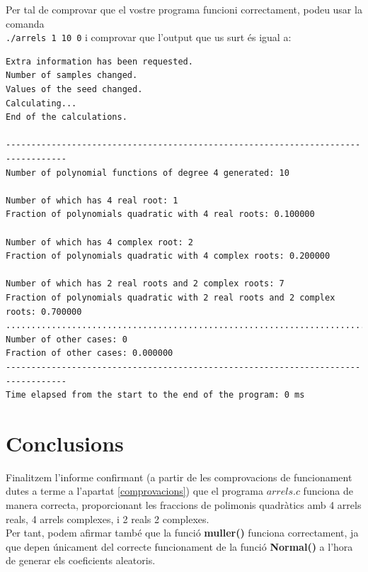 \documentclass[a4paper, 11pt]{article}
\begin{document}
\newpage
\hspace{-1.5em}Per tal de comprovar que el vostre programa funcioni correctament, podeu usar la comanda\\ \texttt{./arrels 1 10 0} i comprovar que l'output que us surt és igual a:\\
\begin{verbatim}
Extra information has been requested.
Number of samples changed.
Values of the seed changed.
Calculating...
End of the calculations.

----------------------------------------------------------------------------------
Number of polynomial functions of degree 4 generated: 10

Number of which has 4 real root: 1
Fraction of polynomials quadratic with 4 real roots: 0.100000 

Number of which has 4 complex root: 2
Fraction of polynomials quadratic with 4 complex roots: 0.200000 

Number of which has 2 real roots and 2 complex roots: 7
Fraction of polynomials quadratic with 2 real roots and 2 complex roots: 0.700000 
..................................................................................
Number of other cases: 0
Fraction of other cases: 0.000000 
----------------------------------------------------------------------------------
Time elapsed from the start to the end of the program: 0 ms
\end{verbatim}



\newpage
\section{Conclusions}
Finalitzem l'informe confirmant (a partir de les comprovacions de funcionament dutes a terme a l'apartat \textcolor{blue}{\ref{comprovacions}}) que el programa $arrels.c$ funciona de manera correcta, proporcionant les fraccions de polimonis quadràtics amb 4 arrels reals, 4 arrels complexes, i 2 reals 2 complexes.\\
Per tant, podem afirmar també que la funció \textbf{\textcolor{funcblue}{muller()}} funciona correctament, ja que depen únicament del correcte funcionament de la funció \textbf{\textcolor{funcblue}{Normal()}} a l'hora de generar els coeficients aleatoris.\\
\end{document}
